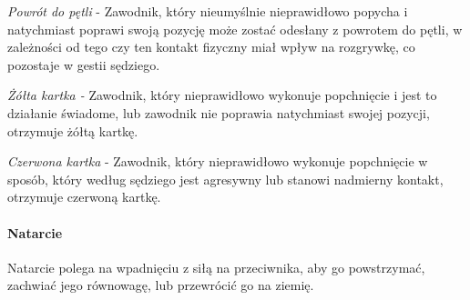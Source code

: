 \documentclass[12pt]{article}
\begin{document}
\emph{Powrót do pętli} - Zawodnik, który nieumyślnie nieprawidłowo
popycha i natychmiast poprawi swoją pozycję może zostać odesłany z
powrotem do pętli, w zależności od tego czy ten kontakt fizyczny miał
wpływ na rozgrywkę, co pozostaje w gestii sędziego.

\emph{Żółta kartka -} Zawodnik, który nieprawidłowo wykonuje popchnięcie
i jest to działanie świadome, lub zawodnik nie poprawia natychmiast
swojej pozycji, otrzymuje żółtą kartkę.

\emph{Czerwona kartka} - Zawodnik, który nieprawidłowo wykonuje
popchnięcie w sposób, który według sędziego jest agresywny lub stanowi
nadmierny kontakt, otrzymuje czerwoną kartkę.

\paragraph{Natarcie}
Natarcie polega na wpadnięciu z siłą na
przeciwnika, aby go powstrzymać, zachwiać jego równowagę, lub przewrócić
go na ziemię.
\end{document}
